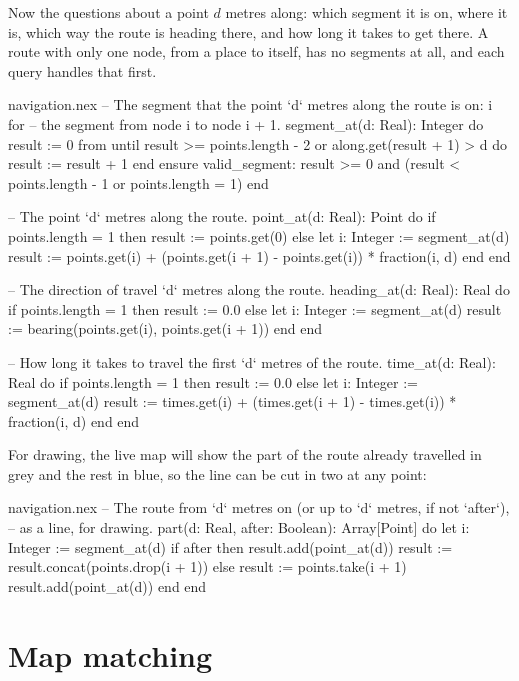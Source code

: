Now the questions about a point $d$ metres along: which segment it is on,
where it is, which way the route is heading there, and how long it takes to
get there. A route with only one node, from a place to itself, has no
segments at all, and each query handles that first.

\begin{continued}{navigation.nex}
  -- The segment that the point `d` metres along the route is on: i for
  -- the segment from node i to node i + 1.
  segment_at(d: Real): Integer do
    result := 0
    from
    until
      result >= points.length - 2 or along.get(result + 1) > d
    do
      result := result + 1
    end
  ensure
    valid_segment: result >= 0 and (result < points.length - 1 or points.length = 1)
  end

  -- The point `d` metres along the route.
  point_at(d: Real): Point do
    if points.length = 1 then
      result := points.get(0)
    else
      let i: Integer := segment_at(d)
      result := points.get(i) + (points.get(i + 1) - points.get(i)) * fraction(i, d)
    end
  end

  -- The direction of travel `d` metres along the route.
  heading_at(d: Real): Real do
    if points.length = 1 then
      result := 0.0
    else
      let i: Integer := segment_at(d)
      result := bearing(points.get(i), points.get(i + 1))
    end
  end

  -- How long it takes to travel the first `d` metres of the route.
  time_at(d: Real): Real do
    if points.length = 1 then
      result := 0.0
    else
      let i: Integer := segment_at(d)
      result := times.get(i) + (times.get(i + 1) - times.get(i)) * fraction(i, d)
    end
  end
\end{continued}

For drawing, the live map will show the part of the route already travelled
in grey and the rest in blue, so the line can be cut in two at any point:

\begin{continued}{navigation.nex}
  -- The route from `d` metres on (or up to `d` metres, if not `after`),
  -- as a line, for drawing.
  part(d: Real, after: Boolean): Array[Point] do
    let i: Integer := segment_at(d)
    if after then
      result.add(point_at(d))
      result := result.concat(points.drop(i + 1))
    else
      result := points.take(i + 1)
      result.add(point_at(d))
    end
  end
\end{continued}

\section{Map matching}

